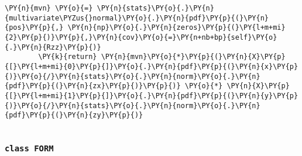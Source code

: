 \begin{tcolorbox}[breakable, size=fbox, boxrule=1pt, pad at break*=1mm,colback=cellbackground, colframe=cellborder]
\begin{Verbatim}[commandchars=\\\{\}]
        \PY{n}{mvn} \PY{o}{=} \PY{n}{stats}\PY{o}{.}\PY{n}{multivariate\PYZus{}normal}\PY{o}{.}\PY{n}{pdf}\PY{p}{(}\PY{n}{pos}\PY{p}{,} \PY{n}{np}\PY{o}{.}\PY{n}{zeros}\PY{p}{(}\PY{l+m+mi}{2}\PY{p}{)}\PY{p}{,}\PY{n}{cov}\PY{o}{=}\PY{n+nb+bp}{self}\PY{o}{.}\PY{n}{Rzz}\PY{p}{)}
        \PY{k}{return} \PY{n}{mvn}\PY{o}{*}\PY{p}{(}\PY{n}{X}\PY{p}{[}\PY{l+m+mi}{0}\PY{p}{]}\PY{o}{.}\PY{n}{pdf}\PY{p}{(}\PY{n}{x}\PY{p}{)}\PY{o}{/}\PY{n}{stats}\PY{o}{.}\PY{n}{norm}\PY{o}{.}\PY{n}{pdf}\PY{p}{(}\PY{n}{zx}\PY{p}{)}\PY{p}{)} \PY{o}{*} \PY{n}{X}\PY{p}{[}\PY{l+m+mi}{1}\PY{p}{]}\PY{o}{.}\PY{n}{pdf}\PY{p}{(}\PY{n}{y}\PY{p}{)}\PY{o}{/}\PY{n}{stats}\PY{o}{.}\PY{n}{norm}\PY{o}{.}\PY{n}{pdf}\PY{p}{(}\PY{n}{zy}\PY{p}{)}
    
\end{Verbatim}
\end{tcolorbox}

    \hypertarget{class-form}{%
\subsubsection{\texorpdfstring{\texttt{class\ FORM}}{class FORM}}\label{class-form}}

